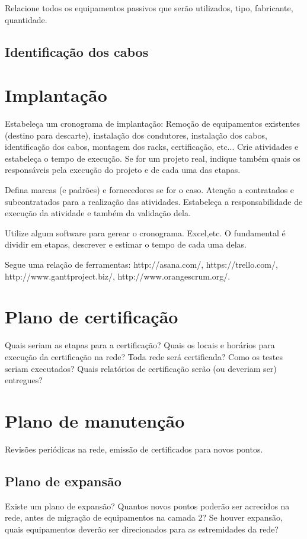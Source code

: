 \documentclass[	DIV=calc,%
							paper=a4,%
							fontsize=12pt,%
							onecolumn]{scrartcl}	 					%
\begin{document}
Relacione todos os equipamentos passivos que serão utilizados, tipo, fabricante, quantidade.

\subsection{Identificação dos cabos}

\section{Implantação}
Estabeleça um cronograma de implantação:
Remoção de equipamentos existentes (destino para descarte), instalação dos condutores, instalação dos cabos, 
identificação dos cabos, montagem dos racks, certificação, etc... Crie atividades e estabeleça o tempo de execução. Se for um projeto real, indique também quais os responsáveis pela execução do projeto e de cada uma das etapas.

Defina marcas (e padrões) e fornecedores se for o caso. Atenção a contratados e subcontratados para a realização das atividades. Estabeleça a responsabilidade de execução da atividade e também da validação dela.

Utilize algum software para gerear o cronograma. Excel,etc. O fundamental é dividir em etapas, descrever e estimar o tempo de cada uma delas.

Segue uma relação de ferramentas:
http://asana.com/, 
https://trello.com/, 
http://www.ganttproject.biz/, 
http://www.orangescrum.org/. 

\section{Plano de certificação}
Quais seriam as etapas para a certificação? 
Quais os locais e horários para execução da certificação na rede? Toda rede será certificada?
Como os testes seriam executados?
Quais relatórios de certificação serão (ou deveriam ser) entregues? 

\section{Plano de manutenção}

Revisões periódicas na rede, emissão de certificados para novos pontos.

\subsection{Plano de expansão}
Existe um plano de expansão? Quantos novos pontos poderão ser acrecidos na rede, antes de migração de equipamentos na camada 2? Se houver expansão, quais equipamentos deverão ser direcionados para as estremidades da rede? 
\end{document}
